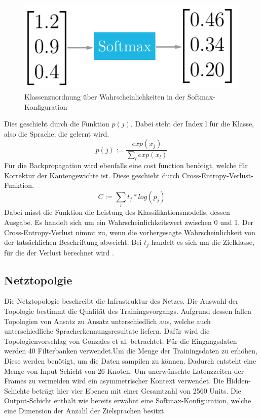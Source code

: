 \begin{figure}[h!]
	\centering
	\includegraphics[width=0.7\linewidth]{images/softmax}
	\caption{Klassenzuordnung über Wahrscheinlichkeiten in der Softmax-Konfiguration \cite{Kulbear.2017}} %
	\label{fig:soft}
\end{figure}
 Dies geschieht durch die Funktion $p(j)$. Dabei steht der Index l für die Klasse, also die Sprache, die gelernt wird.  
\begin{equation*}
p(j) := \frac{ exp(x_{j}) }{\sum_{l}{}{ exp(x_{l})} }
\label{eq:soft}
\end{equation*}
Für die Backpropagation wird ebenfalls eine cost function benötigt, welche für Korrektur der Kantengewichte ist. Diese geschieht durch Cross-Entropy-Verlust-Funktion. 
\begin{equation*}
C:= \sum_{l}{}{ t_{j} * log(p_{j})} 
\label{eq:back}
\end{equation*}
Dabei misst die Funktion die Leistung des 
Klassifikationsmodells, dessen Ausgabe. Es handelt sich um ein Wahrscheinlichkeitswert zwischen 0 und 1. Der Cross-Entropy-Verlust nimmt zu, wenn die vorhergesagte Wahrscheinlichkeit von der tatsächlichen Beschriftung abweicht\cite{MLCheatsheet.2017}. Bei $t_{j}$ handelt es sich um die Zielklasse, für die der Verlust berechnet wird \cite{GonzalezDominguez.2015}.

\subsection{Netztopolgie}
Die Netztopologie beschreibt die Infrastruktur des Netzes. Die Auswahl der Topologie bestimmt die Qualität des Trainingsvorgangs. Aufgrund dessen fallen Topologien von Ansatz zu Ansatz unterschiedlich aus, welche auch unterschiedliche Spracherkennungsresultate liefern. Dafür wird die Topologienvorschlag von Gonzales et al. betrachtet. Für die Eingangsdaten werden 40 Filterbanken verwendet.Um die Menge der Trainingsdaten zu erhöhen,
 Diese werden benötigt, um die Daten sampilen zu können. Dadurch entsteht eine Menge von Input-Schicht von 26 Knoten. Um unerwünschte Latenzzeiten der Frames zu vermeiden wird ein asymmetrischer Kontext verwendet. Die Hidden-Schichte beträgt hier vier Ebenen mit einer Gesamtzahl von 2560 Units. Die Output-Schicht enthält wie bereits erwähnt eine Softmax-Konfiguration, welche eine Dimension der Anzahl der Zielsprachen besitzt.
 
